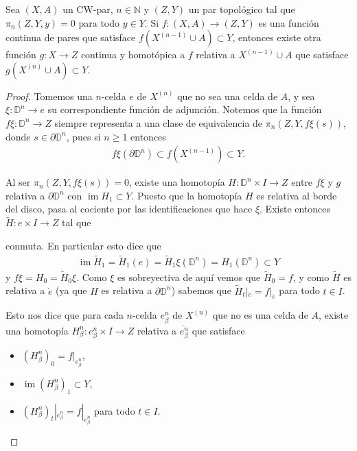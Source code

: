 \documentclass[11pt]{article}
\newcommand{\N}{\mathbb{N}}
\newcommand{\D}{\mathbb{D}}
\newcommand{\im}{\operatorname{im}}
\newcommand{\paint}[1]{\color{color}{#1}}
\newenvironment{lemma}[2][Lema]{\begin{trivlist}
\item[\hskip \labelsep \paint{{\bfseries #1}}\hskip \labelsep {\bfseries #2.}]}{\end{trivlist}}
\begin{document}
\begin{lemma}{1} Sea $(X,A)$ un CW-par, $n \in \N$ y $(Z,Y)$ un par topológico tal que $\pi_n(Z,Y,y) = 0$ para todo $y \in Y$. Si $f : (X,A) \to (Z,Y)$ es una función continua de pares que satisface $f(X^{(n-1)} \cup A) \subset Y$, entonces existe otra función $g : X \to Z$ continua y homotópica a $f$ relativa a $X^{(n-1)} \cup A$ que satisface $g(X^{(n)} \cup A) \subset Y$.
\end{lemma}
\begin{proof} Tomemos una $n$-celda $e$ de $X^{(n)}$ que no sea una celda de $A$, y sea $\xi : \D^n \to e$ su correspondiente función de adjunción. Notemos que la función $f\xi : \D^n \to Z$ siempre representa a una clase de equivalencia de $\pi_n(Z,Y,f\xi(s))$, donde $s \in \partial \D^n$, pues si $n \geq 1$ entonces
\begin{align*}
f\xi(\partial \D^n) \subset f(X^{(n-1)}) \subset Y.
\end{align*}

Al ser $\pi_n(Z,Y,f\xi(s)) = 0$, existe una homotopía $H : \D^n \times I \to Z$ entre $f\xi$ y $g$ relativa  a $\partial \D^n$ con $\im H_1 \subset Y$. Puesto que la homotopía $H$ es relativa al borde del disco, pasa al cociente por las identificaciones que hace $\xi$. Existe entonces $\tilde{H} : e \times I \to Z$ tal que
\begin{center}
\end{center}
conmuta. En particular esto dice que 
\begin{align*}
\im \tilde{H}_1 = \tilde{H}_1(e) = \tilde{H}_1\xi(\D^n) = H_1(\D^n) \subset Y
\end{align*} 
y $f\xi = H_0 = \tilde{H}_0\xi$. Como $\xi$ es sobreyectiva de aquí vemos que $\tilde{H}_0 = f$, y como $\tilde{H}$ es relativa a $\dot{e}$ (ya que $H$ es relativa a $\partial \D^n$) sabemos que $\tilde{H}_t|_{\dot{e}} = f|_{\dot{e}}$ para todo $t \in I$. 

Esto nos dice que para cada $n$-celda $e^n_\beta$ de $X^{(n)}$ que no es una celda de $A$, existe una homotopía $H_\beta^n : e^n_\beta \times I \to Z$ relativa a $\dot{e^n_\beta}$ que satisface
\begin{itemize}
\item $(H_\beta^n)_0 = f|_{e_\beta^n}$,
\item $\im (H_\beta^n)_1 \subset Y$,
\item $(H_\beta^n)_t|_{\dot{e}_\beta^n} = f|_{\dot{e}_\beta^n}$ para todo $t \in I$.
\end{itemize} 


\end{proof}
\end{document}
